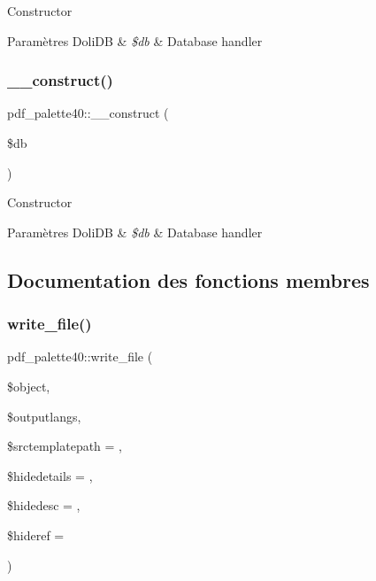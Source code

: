 Constructor


\begin{DoxyParams}[1]{Paramètres}
Doli\+DB & {\em \$db} & Database handler \\
\hline
\end{DoxyParams}
\mbox{\label{classpdf__palette40_a55bd08e699a3e12de75bd4f1ebe01f54}} 
\subsubsection{\texorpdfstring{\+\_\+\+\_\+construct()}{\_\_construct()}\hspace{0.1cm}{\footnotesize\ttfamily [2/2]}}
{\footnotesize\ttfamily pdf\+\_\+palette40\+::\+\_\+\+\_\+construct (\begin{DoxyParamCaption}\item[{}]{\$db }\end{DoxyParamCaption})}

Constructor


\begin{DoxyParams}[1]{Paramètres}
Doli\+DB & {\em \$db} & Database handler \\
\hline
\end{DoxyParams}


\subsection{Documentation des fonctions membres}
\mbox{\label{classpdf__palette40_a6177500b1125aa13a769671bc0a1e231}} 
\subsubsection{\texorpdfstring{write\+\_\+file()}{write\_file()}\hspace{0.1cm}{\footnotesize\ttfamily [1/2]}}
{\footnotesize\ttfamily pdf\+\_\+palette40\+::write\+\_\+file (\begin{DoxyParamCaption}\item[{}]{\$object,  }\item[{}]{\$outputlangs,  }\item[{}]{\$srctemplatepath = {\ttfamily \textquotesingle{}\textquotesingle{}},  }\item[{}]{\$hidedetails = {},  }\item[{}]{\$hidedesc = {},  }\item[{}]{\$hideref = {} }\end{DoxyParamCaption})}

